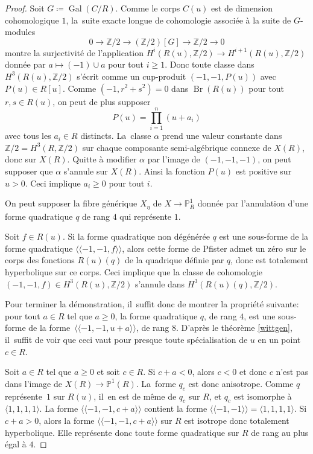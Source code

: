 \documentclass[11pt]{article}
\theoremstyle{definition}
\newcommand{\Z}{\mathbb Z}
\renewcommand{\P}{\mathbb P}
\newcommand{\on}[1]{\operatorname{#1}}
\begin{document}
\begin{proof}
Soit $G\coloneqq \on{Gal}(C/R)$. Comme le corps $C(u)$ est de dimension cohomologique $1$, la~suite exacte longue de cohomologie associée à la suite de $G$-modules \[0\to \Z/2\to (\Z/2)[G]\to \Z/2\to 0\] montre la surjectivité de l'application $H^i(R(u),\Z/2)\to H^{i+1}(R(u),\Z/2)$ donnée par $a\mapsto (-1)\cup a$ pour tout $i\geq 1$. Donc toute classe dans $H^3(R(u),\Z/2)$ s'écrit
comme un cup-produit $(-1,-1,P(u))$ avec $P(u)\in R[u]$. Comme $(-1,r^2+s^2)=0$ dans $\on{Br}(R(u))$ pour tout $r,s\in R(u)$, on peut de plus supposer
\[
P(u) = \prod_{i=1}^n (u+a_{i})
\]
avec tous les $a_{i} \in R$ distincts. La~classe $\alpha$ prend une valeur constante dans $\Z/2= H^3(R, \Z/2)$ sur chaque composante semi-algébrique connexe de $X(R)$, donc sur $X(R)$. Quitte à modifier $\alpha$ par l'image de $(-1,-1,-1)$, on peut supposer que $\alpha$ s'annule sur $X(R)$. Ainsi la fonction $P(u) $ est positive sur $u>0$. Ceci implique $a_{i} \geq 0$ pour tout $i$.

On peut supposer la fibre générique $X_{\eta}$ de $X\to \P^1_R$ donnée par l'annulation d'une forme quadratique $q$ de rang $4$ qui représente $1$.

Soit $f\in R(u)$.
Si la forme quadratique non dégénérée $q$ est une sous-forme de la forme quadratique
$\langle \!\langle -1,-1, f\rangle \!\rangle $, alors cette forme de Pfister admet un zéro sur le corps des fonctions
$R(u)(q)$ de la quadrique définie par $q$, donc est totalement hyperbolique sur
ce corps. Ceci implique que la classe de cohomologie $(-1,-1,f) \in H^3(R(u),\Z/2)$
s'annule dans $H^3(R(u)(q),\Z/2)$.

Pour terminer la démonstration, il~suffit donc de montrer la propriété suivante:
pour tout $a\!\in\! R$ tel que $a \!\geq\!0$, la forme quadratique $q$, de rang $4$,
est une sous-forme de la forme~\hbox{$\!\langle \!\langle -1,-1, u+a \rangle \!\rangle$}, de rang 8.
D'après le théorème \ref{wittgen}, il~suffit de voir
que ceci vaut pour presque toute spécialisation de $u$
en un point $c\in R$.

Soit $a\in R$ tel que $a\geq 0$ et soit $c\in R$.
Si $c+a <0$, alors $c<0$ et donc $c$ n'est pas dans l'image de
$X(R) \to \P^1(R)$. La~forme $q_{c}$ est donc anisotrope.
Comme $q$ représente~$1$ sur $R(u)$, il~en est de même de $q_{c}$ sur $R$,
et $q_{c}$ est isomorphe à $\langle 1,1,1,1\rangle $.
La forme $\langle \!\langle-1,-1, c+a \rangle \!\rangle$ contient la forme
$\langle \!\langle -1,-1 \rangle \!\rangle=\langle 1,1,1,1 \rangle$. Si $c+a>0$, alors la forme $\langle \!\langle -1,-1, c+a\rangle \!\rangle$ sur $R$ est isotrope donc totalement
hyperbolique. Elle représente donc toute forme quadratique sur $R$
de rang au plus égal à $4$.


\end{proof}
\end{document}
